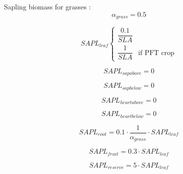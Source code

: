 Sapling biomass for grasses : \\

\begin{equation}
\alpha_{grass} = 0.5
\end{equation}

\begin{equation}
SAPL_{leaf}
\begin{cases}
\dfrac{0.1}{SLA} & \\
\dfrac{1}{SLA} & \text{if PFT crop}
\end{cases} %
\end{equation}

\begin{equation}
SAPL_{sapabove} = 0
\end{equation}

\begin{equation}
SAPL_{sapbelow} = 0
\end{equation}


\begin{equation}
SAPL_{heartabove} = 0
\end{equation}

\begin{equation}
SAPL_{heartbelow} = 0
\end{equation}

\begin{equation}
SAPL_{root} = 0.1 \cdot \frac{1}{\alpha_{grass}} \cdot SAPL_{leaf} 
\end{equation}

\begin{equation}
SAPL_{fruit} = 0.3 \cdot SAPL_{leaf} 
\end{equation}

\begin{equation}
SAPL_{reserve} = 5 \cdot SAPL_{leaf}  
\end{equation}

